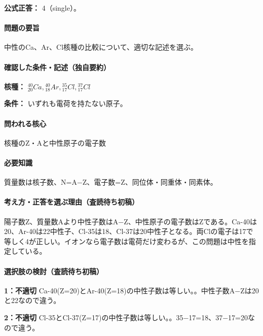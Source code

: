 \textbf{公式正答：} 4（single）。

\paragraph{問題の要旨} 中性のCa、Ar、Cl核種の比較について、適切な記述を選ぶ。

\paragraph{確認した条件・記述（独自要約）}\mbox{}\par

\noindent\textbf{核種：} \({}^{40}_{20}Ca,{}^{40}_{18}Ar,{}^{35}_{17}Cl,{}^{37}_{17}Cl\)\par

\noindent\textbf{条件：} いずれも電荷を持たない原子。\par

\paragraph{問われる核心} 核種のZ・Aと中性原子の電子数

\paragraph{必要知識} 質量数は核子数、N=\allowbreak{}A−Z、電子数=Z、同位体・同重体・同素体。

\paragraph{考え方・正答を選ぶ理由（査読待ち初稿）} 陽子数Z、質量数Aより中性子数はA−Z、中性原子の電子数はZである。Ca-40は20、Ar-40は22中性子、Cl-35は18、Cl-37は20中性子となる。両Clの電子は17で等しく4が正しい。イオンなら電子数は電荷だけ変わるが、この問題は中性を指定している。

\paragraph{選択肢の検討（査読待ち初稿）}\mbox{}\par

\noindent\textbf{1：不適切} Ca-40(Z=\allowbreak{}20)とAr-40(Z=\allowbreak{}18)の中性子数は等しい。。中性子数A−Zは20と22なので違う。\par

\noindent\textbf{2：不適切} Cl-35とCl-37(Z=\allowbreak{}17)の中性子数は等しい。。35−17=\allowbreak{}18、37−17=\allowbreak{}20なので違う。\par

